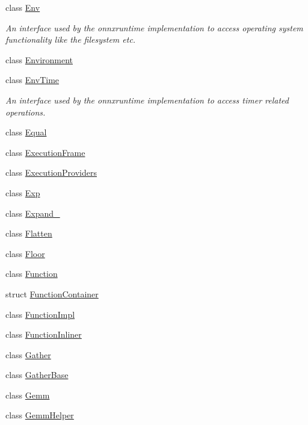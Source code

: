 \begin{DoxyCompactItemize}
class \mbox{\hyperlink{classonnxruntime_1_1Env}{Env}}
\begin{DoxyCompactList}\small\item\em An interface used by the onnxruntime implementation to access operating system functionality like the filesystem etc. \end{DoxyCompactList}\item 
class \mbox{\hyperlink{classonnxruntime_1_1Environment}{Environment}}
\item 
class \mbox{\hyperlink{classonnxruntime_1_1EnvTime}{Env\+Time}}
\begin{DoxyCompactList}\small\item\em An interface used by the onnxruntime implementation to access timer related operations. \end{DoxyCompactList}\item 
class \mbox{\hyperlink{classonnxruntime_1_1Equal}{Equal}}
\item 
class \mbox{\hyperlink{classonnxruntime_1_1ExecutionFrame}{Execution\+Frame}}
\item 
class \mbox{\hyperlink{classonnxruntime_1_1ExecutionProviders}{Execution\+Providers}}
\item 
class \mbox{\hyperlink{classonnxruntime_1_1Exp}{Exp}}
\item 
class \mbox{\hyperlink{classonnxruntime_1_1Expand__8}{Expand\+\_}}
\item 
class \mbox{\hyperlink{classonnxruntime_1_1Flatten}{Flatten}}
\item 
class \mbox{\hyperlink{classonnxruntime_1_1Floor}{Floor}}
\item 
class \mbox{\hyperlink{classonnxruntime_1_1Function}{Function}}
\item 
struct \mbox{\hyperlink{structonnxruntime_1_1FunctionContainer}{Function\+Container}}
\item 
class \mbox{\hyperlink{classonnxruntime_1_1FunctionImpl}{Function\+Impl}}
\item 
class \mbox{\hyperlink{classonnxruntime_1_1FunctionInliner}{Function\+Inliner}}
\item 
class \mbox{\hyperlink{classonnxruntime_1_1Gather}{Gather}}
\item 
class \mbox{\hyperlink{classonnxruntime_1_1GatherBase}{Gather\+Base}}
\item 
class \mbox{\hyperlink{classonnxruntime_1_1Gemm}{Gemm}}
\item 
class \mbox{\hyperlink{classonnxruntime_1_1GemmHelper}{Gemm\+Helper}}
\item 

\end{DoxyCompactItemize}
